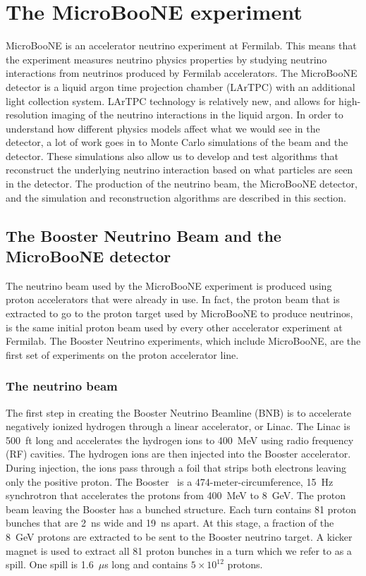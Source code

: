 \section{The MicroBooNE experiment}\label{microboone}
MicroBooNE is an accelerator neutrino experiment at Fermilab. This means that
the experiment measures neutrino physics properties by studying neutrino
interactions from neutrinos produced by Fermilab accelerators. The MicroBooNE
detector is a liquid argon time projection chamber (LArTPC) with an additional
light collection system. LArTPC technology is relatively new, and allows for
high-resolution imaging of the neutrino interactions in the liquid argon. In
order to understand how different physics models affect what we would see in
the detector, a lot of work goes in to Monte Carlo simulations of the beam and
the detector. These simulations also allow us to develop and test algorithms
that reconstruct the underlying neutrino interaction based on what particles
are seen in the detector. The production of the neutrino beam, the MicroBooNE
detector, and the simulation and reconstruction algorithms are described in
this section.

\subsection{The Booster Neutrino Beam and the MicroBooNE detector}\label{sec:beam}
  The neutrino beam used by the MicroBooNE experiment is produced using proton
  accelerators that were already in use. In fact, the proton beam that is
  extracted to go to the proton target used by MicroBooNE to produce neutrinos,
  is the same initial proton beam used by every other accelerator experiment at
  Fermilab. The Booster Neutrino experiments, which include MicroBooNE, are the
  first set of experiments on the proton accelerator line.

  \subsubsection{The neutrino beam}
    The first step in creating the Booster Neutrino Beamline (BNB) is to
    accelerate negatively ionized hydrogen through a linear accelerator, or
    Linac. The Linac is 500~ft long and accelerates the hydrogen ions to
    400~MeV using radio frequency (RF) cavities. The hydrogen ions are then
    injected into the Booster accelerator. During injection, the ions pass
    through a foil that strips both electrons leaving only the positive proton.
    The Booster~\cite{MinibooneBeam} is a 474-meter-circumference, 15~Hz
    synchrotron that accelerates the protons from 400~MeV to 8~GeV. The proton
    beam leaving the Booster has a bunched structure. Each turn contains 81
    proton bunches that are 2~ns wide and 19~ns apart. At this stage, a
    fraction of the 8~GeV protons are extracted to be sent to the Booster
    neutrino target. A kicker magnet is used to extract all 81 proton bunches
    in a turn which we refer to as a spill. One spill is 1.6~$\mu$s long and
    contains $5\times 10^{12}$ protons.

